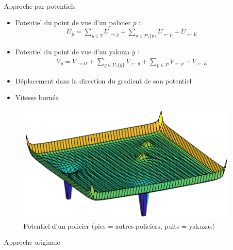 \documentclass[final,hyperref={pdfpagelabels=false}]{beamer}
\begin{document}
\begin{frame}[t]
\begin{columns}[t]
\begin{column}{.465\textwidth}
\begin{block}{{\Large Approche par potentiels}}
\begin{itemize}
\item Potentiel du point de vue d'un policier $\overline{p}$ :
\begin{align*}
U_{\overline{p}} = \sum_{y \in Y} U_{\to y} + \sum_{p \in P\setminus\{\overline{p}\}} U_{\gets p} + U_{\gets E}
\end{align*}
\item Potentiel du point de vue d'un yakuza $\overline{y}$ :
\begin{align*}
V_{\overline{y}} = V_{\to O} + \sum_{y \in Y \setminus \{\overline{y}\}} V_{\gets y} + \sum_{p \in P} V_{\gets p} + V_{\gets E}
\end{align*}
\item D\'eplacement dans la direction du gradient de son potentiel
\item Vitesse born\'ee
\end{itemize}
\end{block}
\begin{figure}
\includegraphics[width=0.8\linewidth]{potentials.png}
\caption{\text{ } Potentiel d'un policier (pics = autres policiers, puits = yakuzas)}
\end{figure}

{
\begin{block}{{\Large Approche originale}}




\end{block}}
\end{column}
\end{columns}
\end{frame}
\end{document}
